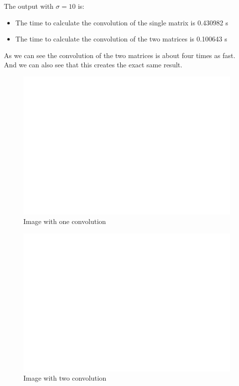 \documentclass[11pt]{article}
\begin{document}
The output with \(\sigma=10\) is:
\begin{itemize}
\item The time to calculate the convolution of the single matrix is 0.430982 s
\item The time to calculate the convolution of the two matrices is 0.100643 s
\end{itemize}
As we can see the convolution of the two matrices is about four times as fast. And we can also see that this creates the exact same result.\\
\begin{FIGURE}
\begin{figure}[H]
\centering
\includegraphics[width=.9\linewidth]{ENG204-Assignment-3-Single-sigma-10.png}
\caption{Image with one convolution}
\end{figure}
\end{FIGURE}
\begin{FIGURE}
\begin{figure}[H]
\centering
\includegraphics[width=.9\linewidth]{ENG204-Assignment-3-Double-sigma-10.png}
\caption{Image with two convolution}
\end{figure}
\end{FIGURE}
\end{document}
